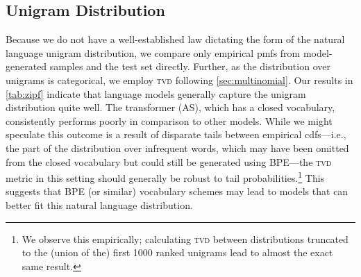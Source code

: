 \documentclass[11pt,a4paper]{article}
\newcommand{\stat}{\phi}
\newcommand{\yy}{\mathbf{y}}
\newcommand{\calS}{\mathcal{S}}
\newcommand{\Ytest}{Y_{\scaleto{\mathrm{test}}{6pt}}}
\newcommand{\Ymodel}{Y_{\scaleto{\mathrm{model}}{6pt}}}
\begin{document}




\subsection{Unigram Distribution}
Because we do not have a well-established law dictating the form of the natural language unigram distribution, we compare only empirical pmfs from model-generated samples and the test set directly. 
Further, as the distribution over unigrams is categorical, we employ \textsc{tvd} following \cref{sec:multinomial}. Our results in \cref{tab:zipf} indicate that language models generally capture the unigram distribution quite well. The transformer (AS), which has a closed vocabulary, consistently performs poorly in comparison to other models. While we might speculate this outcome is a result of disparate tails between empirical cdfs---i.e., the part of the distribution over infrequent words, which may have been omitted from the closed vocabulary but could still be generated using BPE---the \textsc{tvd} metric in this setting should generally be robust to tail probabilities.\footnote{We observe this empirically; calculating \textsc{tvd} between distributions truncated to the (union of the) first 1000 ranked unigrams lead to almost the exact same result.} This suggests that BPE (or similar) vocabulary schemes may lead to models that can better fit this natural language distribution. %
\end{document}
